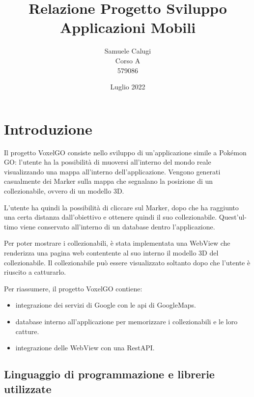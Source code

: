 \documentclass{article}
\title{Relazione Progetto Sviluppo Applicazioni Mobili}
\date{Luglio 2022}
\author{Samuele Calugi\\ Corso A \\ 579086}
\begin{document}
\maketitle
\tableofcontents

\section{Introduzione}
Il progetto VoxelGO consiste nello sviluppo di un'applicazione simile a Pokémon GO: l'utente ha la possibilità di muoversi all'interno del mondo reale visualizzando 
una mappa all'interno dell'applicazione. Vengono generati casualmente dei Marker sulla mappa che segnalano la posizione di un collezionabile, ovvero di un modello
3D. 

L'utente ha quindi la possibilità di cliccare sul Marker, dopo che ha raggiunto una certa distanza dall'obiettivo e ottenere quindi il suo collezionabile. 
Quest'ul-timo viene conservato all'interno di un database dentro l'applicazione. 

Per poter mostrare i collezionabili, è stata implementata una WebView che renderizza una pagina web contentente al suo interno il modello 3D del collezionabile.
Il collezionabile può essere visualizzato soltanto dopo che l'utente è riuscito a catturarlo.

\medskip

Per riassumere, il progetto VoxelGO contiene:
\begin{itemize}
    \itemsep 0em 
    \item integrazione dei servizi di Google con le api di GoogleMaps.
    \item database interno all'applicazione per memorizzare i collezionabili e le loro catture.
    \item integrazione delle WebView con una RestAPI.
\end{itemize}

\subsection{Linguaggio di programmazione e librerie utilizzate}
\end{document}
